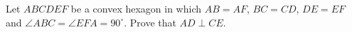 Let $ABCDEF$ be a convex hexagon in which $AB=AF$,  $BC=CD$,  $DE=EF$ and $\angle ABC = \angle EFA = 90^{\circ}$. Prove that $AD\perp CE$.